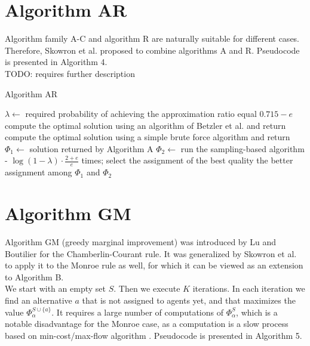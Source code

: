 \section{Algorithm AR}

Algorithm family A-C and algorithm R are naturally suitable for different cases. Therefore, Skowron et al. \cite{1} proposed to combine algorithms A and R. Pseudocode is presented in Algorithm 4.
\\

TODO: requires further description

\begin{algorithm}
\caption{Algorithm AR}\label{euclid}
\begin{algorithmic}[1]
		\State $\lambda \gets$ required probability of achieving the approximation ratio equal $0.715 - e$
			\State compute the optimal solution using an algorithm of Betzler et al. \cite{3} and return
		\EndIf
			\State compute the optimal solution using a simple brute force algorithm and return
		\EndIf
		\State $\Phi_{1} \gets$ solution returned by Algorithm A
		\State $\Phi_{2} \gets$ run the sampling-based algorithm - $\log (1 - \lambda) \cdot \frac{2 + e}{e}$ times; select the assignment of the best quality
		\State \Return the better assignment among $\Phi_{1}$ and $\Phi_{2}$
	\EndProcedure
\end{algorithmic}
\end{algorithm}

\section{Algorithm GM}

Algorithm GM (greedy marginal improvement) was introduced by Lu and Boutilier \cite{4} for the Chamberlin-Courant rule. It was generalized by Skowron et al. \cite{1} to apply it to the Monroe rule as well, for which it can be viewed as an extension to Algorithm B.
\\

We start with an empty set $S$. Then we execute $K$ iterations. In each iteration we find an alternative $a$ that is not assigned to agents yet, and that maximizes the value $\Phi^{S \cup \{a\}}_{\alpha}$. It requires a large number of computations of $\Phi^{S}_{\alpha}$, which is a notable disadvantage for the Monroe case, as a computation is a slow process based on min-cost/max-flow algorithm \cite{3}. Pseudocode is presented in Algorithm 5.

